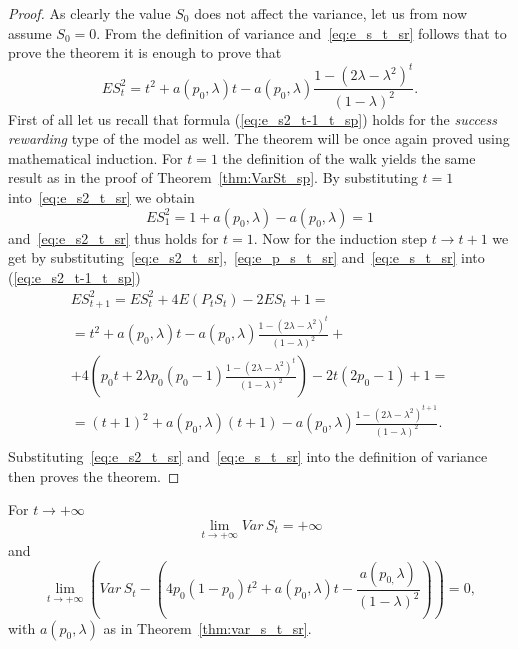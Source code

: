 \documentclass[runningheads]{CMSIM}
\begin{document}
    \begin{proof}
        As clearly the value $S_{0}$ does not affect the variance, let us
        from now assume $S_{0}=0$.
        From the definition of variance and~\eqref{eq:e_s_t_sr}
        follows that to prove the theorem it is enough to prove that
        \begin{equation}
            ES_{t}^{2}=t^{2}+a(p_{0},\lambda)t-a(p_{0},\lambda)\frac{1-(2\lambda-\lambda^{2})^{t}}{(1-\lambda)^{2}}.\label{eq:e_s2_t_sr}
        \end{equation}
        First of all let us recall that formula (\ref{eq:e_s2_t-1_t_sp})
        holds for the \emph{success rewarding} type of the model as well.
        The theorem will be once again proved using mathematical induction.
        For $t=1$ the definition of the walk yields the same result as in
        the proof of Theorem~\ref{thm:VarSt_sp}.
        By substituting $t=1$
        into~\eqref{eq:e_s2_t_sr} we obtain
        \[
            ES_{1}^{2}=1+a(p_{0},\lambda)-a(p_{0},\lambda)=1
        \]
        and~\eqref{eq:e_s2_t_sr} thus holds for $t=1$.
        Now for the induction
        step $t\rightarrow t+1$ we get by substituting~\eqref{eq:e_s2_t_sr},~\eqref{eq:e_p_s_t_sr} and~\eqref{eq:e_s_t_sr} into (\ref{eq:e_s2_t-1_t_sp})
        \begin{gather*}
            ES_{t+1}^{2}=ES_{t}^{2}+4E(P_{t}S_{t})-2ES_{t}+1=\\
            =t^{2}+a(p_{0},\lambda)t-a(p_{0},\lambda)\frac{1-(2\lambda-\lambda^{2})^{t}}{(1-\lambda)^{2}}+\\
            +4(p_{0}t+2\lambda p_{0}(p_{0}-1)\frac{1-(2\lambda-\lambda^{2})^{t}}{(1-\lambda)^{2}})-2t(2p_{0}-1)+1=\\
            =(t+1)^{2}+a(p_{0},\lambda)(t+1)-a(p_{0},\lambda)\frac{1-(2\lambda-\lambda^{2})^{t+1}}{(1-\lambda)^{2}}.\\
        \end{gather*}
        Substituting~\eqref{eq:e_s2_t_sr} and~\eqref{eq:e_s_t_sr} into the
        definition of variance then proves the theorem.
    \end{proof}
    \begin{corollary}
        \label{cor:var_s_t_sr}For $t\rightarrow+\infty$
        \[
            \lim_{t\rightarrow+\infty}Var\,S_{t}=+\infty
        \]
        and
        \[
            \lim_{t\rightarrow+\infty}\left(Var\,S_{t}-\left(4p_{0}(1-p_{0})t^{2}+a(p_{0},\lambda)t-\frac{a(p_{0,}\lambda)}{(1-\lambda)^{2}}\right)\right)=0,
        \]
        with $a(p_{0},\lambda)$ as in Theorem~\ref{thm:var_s_t_sr}.
    \end{corollary}
\end{document}
